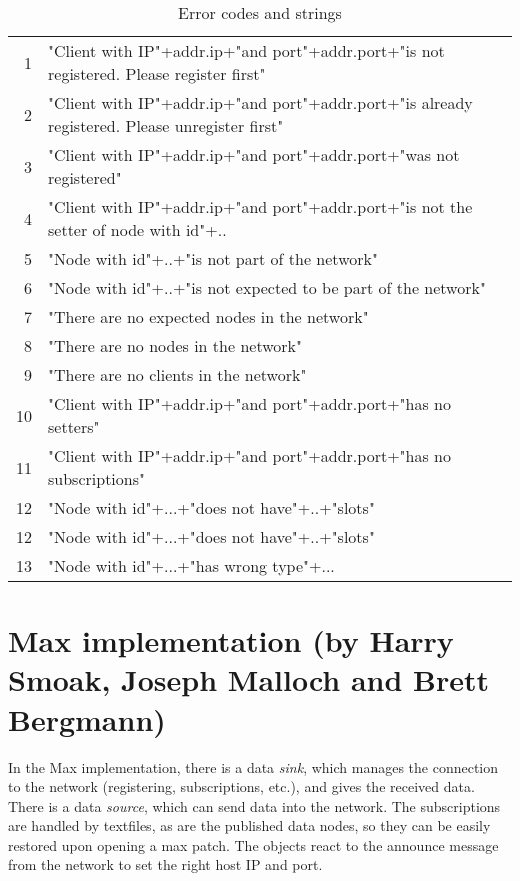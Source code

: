 \documentclass[letterpaper,10pt]{article}
\begin{document}
\begin{table}
\small
\begin{center}
\begin{tabular}{|rl|}
 \hline
  1 & "Client with IP"+addr.ip+"and port"+addr.port+"is not registered. Please register first" \\
  2 & "Client with IP"+addr.ip+"and port"+addr.port+"is already registered. Please unregister first" \\
  3 & "Client with IP"+addr.ip+"and port"+addr.port+"was not registered"  \\
  4 & "Client with IP"+addr.ip+"and port"+addr.port+"is not the setter of node with id"+..  \\
  5 & "Node with id"+..+"is not part of the network" \\
  6 & "Node with id"+..+"is not expected to be part of the network"  \\
  7 & "There are no expected nodes in the network" \\
  8 & "There are no nodes in the network"  \\
  9 & "There are no clients in the network"  \\
 10 & "Client with IP"+addr.ip+"and port"+addr.port+"has no setters"  \\
 11 & "Client with IP"+addr.ip+"and port"+addr.port+"has no subscriptions" \\
 12 & "Node with id"+...+"does not have"+..+"slots" \\
 12 & "Node with id"+...+"does not have"+..+"slots" \\
 13 & "Node with id"+...+"has wrong type"+... \\
 \hline
 \end{tabular}
\end{center}
\caption{Error codes and strings}
\label{errorcodes}
\end{table}


\section{Max implementation (by Harry Smoak, Joseph Malloch and Brett Bergmann)}
In the Max implementation, there is a data \textit{sink}, which manages the connection to the network (registering, subscriptions, etc.), and gives the received data. There is a data \textit{source}, which can send data into the network. The subscriptions are handled by textfiles, as are the published data nodes, so they can be easily restored upon opening a max patch.
The objects react to the announce message from the network to set the right host IP and port.
\end{document}

